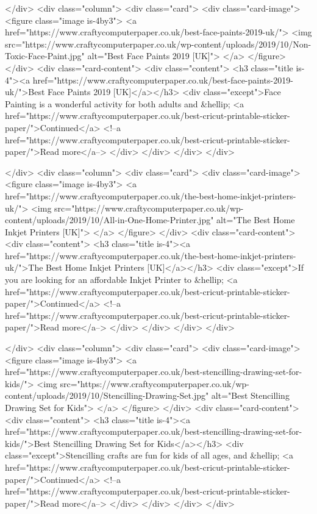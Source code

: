     </div>
      <div class="column">
      <div class="card">
        <div class="card-image">
          <figure class="image is-4by3">
          <a href="https://www.craftycomputerpaper.co.uk/best-face-paints-2019-uk/">
                          <img src="https://www.craftycomputerpaper.co.uk/wp-content/uploads/2019/10/Non-Toxic-Face-Paint.jpg" alt="Best Face Paints 2019 [UK]">
                      </a>
          </figure>
        </div>
        <div class="card-content">
          <div class="content">
            <h3 class="title is-4"><a href="https://www.craftycomputerpaper.co.uk/best-face-paints-2019-uk/">Best Face Paints 2019 [UK]</a></h3>
            <div class="except">Face Painting is a wonderful activity for both adults and &hellip; <a href="https://www.craftycomputerpaper.co.uk/best-cricut-printable-sticker-paper/">Continued</a> <!--a href="https://www.craftycomputerpaper.co.uk/best-cricut-printable-sticker-paper/">Read more</a--> </div>
          </div>
        </div>
      </div>

    </div>
      <div class="column">
      <div class="card">
        <div class="card-image">
          <figure class="image is-4by3">
          <a href="https://www.craftycomputerpaper.co.uk/the-best-home-inkjet-printers-uk/">
                          <img src="https://www.craftycomputerpaper.co.uk/wp-content/uploads/2019/10/All-in-One-Home-Printer.jpg" alt="The Best Home Inkjet Printers [UK]">
                      </a>
          </figure>
        </div>
        <div class="card-content">
          <div class="content">
            <h3 class="title is-4"><a href="https://www.craftycomputerpaper.co.uk/the-best-home-inkjet-printers-uk/">The Best Home Inkjet Printers [UK]</a></h3>
            <div class="except">If you are looking for an affordable Inkjet Printer to &hellip; <a href="https://www.craftycomputerpaper.co.uk/best-cricut-printable-sticker-paper/">Continued</a> <!--a href="https://www.craftycomputerpaper.co.uk/best-cricut-printable-sticker-paper/">Read more</a--> </div>
          </div>
        </div>
      </div>

    </div>
      <div class="column">
      <div class="card">
        <div class="card-image">
          <figure class="image is-4by3">
          <a href="https://www.craftycomputerpaper.co.uk/best-stencilling-drawing-set-for-kids/">
                          <img src="https://www.craftycomputerpaper.co.uk/wp-content/uploads/2019/10/Stencilling-Drawing-Set.jpg" alt="Best Stencilling Drawing Set for Kids">
                      </a>
          </figure>
        </div>
        <div class="card-content">
          <div class="content">
            <h3 class="title is-4"><a href="https://www.craftycomputerpaper.co.uk/best-stencilling-drawing-set-for-kids/">Best Stencilling Drawing Set for Kids</a></h3>
            <div class="except">Stencilling crafts are fun for kids of all ages, and &hellip; <a href="https://www.craftycomputerpaper.co.uk/best-cricut-printable-sticker-paper/">Continued</a> <!--a href="https://www.craftycomputerpaper.co.uk/best-cricut-printable-sticker-paper/">Read more</a--> </div>
          </div>
        </div>
      </div>

